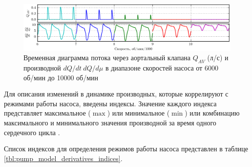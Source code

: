 \begin{figure}[ht] 
  \center
  \includegraphics [scale=1.0] {../images/c3_example_correlation}
  \caption{Временная диаграмма потока через аортальный клапана $Q_{AV}$ (л/с) и производной $dQ/dt~dQ/d\mu$ в диапазоне скоростей насоса от 6000 об/мин до 10000 об/мин} 
  \label{img:av_derivative_waveform}  
\end{figure}

Для описания изменений в динамике производных, которые коррелируют с режимами работы насоса, введены индексы. Значение каждого индекса представляет максимальное ($\max$) или минимальное ($\min$) или комбинацию максимального и минимального значения производной за время одного сердечного цикла \cite{mt6_2014_main, rgc_2015}. 

Список индексов для определения режимов работы насоса представлен в таблице \ref{tbl:pump_model_derivatives_indices}. 

